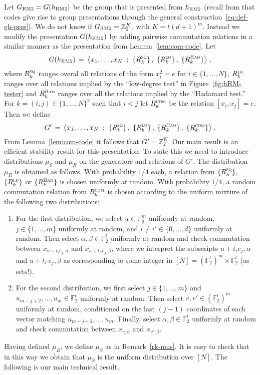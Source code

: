 \documentclass[11pt]{article}
\theoremstyle{definition}
\newcommand{\F}{\ensuremath{\mathbb{F}}}
\newcommand{\ld}{\textsc{ld}}
\newcommand{\com}{\textsc{com}}
\newcommand{\sq}{\textsc{sq}}
\newcommand{\Z}{\ensuremath{\mathbb{Z}}}
\newcommand{\bRM}{\ensuremath{\textsc{RM2}}}
\newcommand{\had}{\textsc{Had}}
\begin{document}
Let $G_\bRM = G(h_\bRM)$ be the group that is presented from $h_\bRM$ (recall from  that codes give rise to group presentations through the general construction~\eqref{eq:def-gh-pres}). We do not know if $G_\bRM = \Z_2^K$, with $K=t(d+1)^m$. Instead we modify the presentation $G(h_\bRM)$ by adding pairwise commutation relations in a similar manner as the presentation from Lemma~\ref{lem:com-code}. Let 
\[ G(h_\bRM) \,=\, \big\langle x_1,\ldots,x_N \;:\; \{R^\sq_k\}\,,\; \{R^\ld_k\}\,,\; \{R^\had_{k}\} \big\rangle\;,\]
where  $R^\sq_k$ ranges overal all relations of the form $x_i^2=e$ for $i\in \{1,\ldots,N\}$, $R^\ld_k$ ranges over all relations implied by the ``low-degree test'' in Figure~\ref{fig:bRM-tester} and $R^\had_{k}$ ranges over all the relations implied by the ``Hadamard test.'' For $k=(i,j)\in\{1,\ldots,N\}^2$ such that $i<j$ let $R^\com_k$ be the relation $[x_i,x_j]=e$.
Then we define
\begin{equation}\label{eq:z2k-eff}
 G' \,=\,\big\langle x_1,\ldots,x_N \;:\; \{R^\sq_k\}\,,\; \{R^\ld_k\}\,,\; \{R^\had_{k}\}\, , \; \{ R^\com_k\}\big\rangle\;.
\end{equation}
From Lemma~\ref{lem:com-code} it follows that $G'=\Z_2^K$. Our main result is an efficient stability result for this presentation. To state this we need to introduce distributions $\mu_S$ and $\mu_R$ on the generators and relations of $G'$. The distribution $\mu_R$ is obtained as follows. With probability $1/4$ each, a relation from $\{R^\sq_k\}$, $\{R^\ld_k\}$ or $\{R^\had_k\}$ is chosen uniformly at random. With probability $1/4$, a random commutation relation from $R^\com_k$ is chosen according to the uniform mixture of the following two distributions:
\begin{enumerate}
\item For the first distribution, we select $u\in \F_q^m$ uniformly at random, $j\in\{1,\ldots,m\}$ uniformly at random, and $i\neq i'\in\{0,\ldots,d\}$ uniformly at random. Then select $\alpha,\beta\in \F_2^t$ uniformly at random and check commutation between $x_{u+t_i e_j,\alpha}$ and $x_{u+t_{i'} e_j,\beta}$, where we interpret the subscripts  $u+t_i e_j,\alpha$ and $u+t_{i'} e_j,\beta$ as corresponding to some integer in $[N]= (\F_2^t)^m \times \F_2^t$ (as sets!). 

\item For the second distribution, we first select $j\in\{1,\ldots,m\}$ and $u_{m-j+2},\ldots,u_m \in \F_2^t$ uniformly at random. Then select $v,v' \in (\F_2^t)^m$ uniformly at random, conditioned on the last $(j-1)$ coordinates of each vector matching $u_{m-j+2},\ldots,u_m$. Finally, select $\alpha,\beta\in \F_2^t$ uniformly at random and check commutation between $x_{v,\alpha}$ and $x_{v',\beta}$. 
\end{enumerate}
Having defined $\mu_R$, we define $\mu_S$ as in Remark~\ref{rk-mus}. It is easy to check that in this way we obtain that $\mu_S$ is the uniform distribution over $[N] $. The following is our main technical result. 
\end{document}

